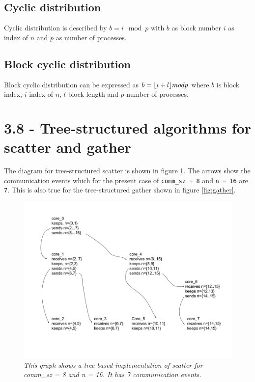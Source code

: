 \documentclass[a4paper,11pt,twoside]{article}
\DeclarePairedDelimiter{\floor}{\lfloor}{\rfloor}
\begin{document}
\subsection*{Cyclic distribution}
Cyclic distribution is described by $b = i\mod p$ with $b$ as block number $i$ as index of $n$ and $p$ as number of processes. 

\subsection*{Block cyclic distribution}
Block cyclic distribution can be expressed as $b = \floor*{i \div l} mod p$ where $b$ is block index, $i$ index of $n$, $l$ block length and $p$ number of processes.

\section{3.8 - Tree-structured algorithms for scatter and gather}
The diagram for tree-structured scatter is shown in figure \ref{fig:scatter}. The arrows show the communication events which for the present case of \verb+comm_sz = 8+ and \verb+n = 16+ are \verb+7+. This is also true for the tree-structured gather shown in figure \ref{fig:gather}.
\begin{figure}
  \centering
  \includegraphics[width=1\textwidth]{scatter.png}
  \caption{\textit{This graph shows a tree based implementation of scatter for comm\_sz = 8 and n = 16. It has 7 communication events.}}
  \label{fig:scatter}
\end{figure}
\end{document}
